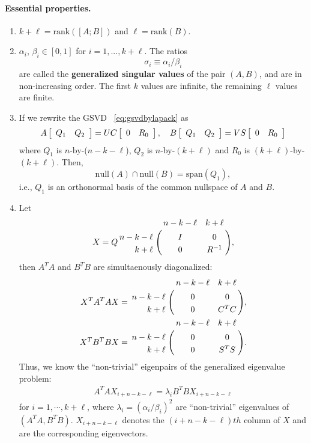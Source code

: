 \paragraph{Essential properties.} \label{properties}
\begin{enumerate}
\item $k+\ell = \mbox{rank}([A; B])$ and $\ell = \mbox{rank}(B)$.

\item 
$\alpha_i$, $\beta_i \in [0, 1]$ for $i = 1,..., k+\ell$. The ratios 
\begin{equation} \label{eq:gsvdef}  
\sigma_i \equiv \alpha_i/\beta_i
\end{equation} 
are called the 
\textbf{generalized singular values} of the pair $(A, B)$, 
and are in non-increasing order. 
The first $k$ values are infinite, 
the remaining $\ell$ values are finite.
         
\item If we rewrite the GSVD ~\eqref{eq:gsvdbylapack} as 
\begin{align}
A\left[ \begin{array}{cc} Q_1 & Q_2 \end{array} \right] = UC\left[ \begin{array}{cc} 0 & R_0 \end{array} \right], \quad 
B\left[ \begin{array}{cc} Q_1 & Q_2 \end{array} \right] = VS\left[ \begin{array}{cc} 0 & R_0 \end{array} \right]
\end{align}
where $Q_1$ is $n$-by-($n-k-\ell$), $Q_2$ is $n$-by-$(k+\ell)$ 
and $R_0$ is $(k+\ell)$-by-$(k+\ell)$. Then, 
\[
\mbox{null}(A)\cap \mbox{null}(B) = \mbox{span}(Q_1),
\] 
i.e., $Q_1$ is an orthonormal basis 
of the common nullspace of $A$ and $B$.
         
\item Let 
\begin{align} 
X = Q\bordermatrix{ & n-k-\ell & k+\ell   \cr
                   \hfill n-k-\ell & I & 0 \cr
                   \hfill k+\ell & 0 & R^{-1} }, \label{eq:simuldiag1}
\end{align}
then $A^TA$ and $B^TB$ are simultaenously diagonalized: 
\begin{subequations} \label{eq:simuldiag} 
\begin{align} 
X^TA^TAX & = \bordermatrix{ & n-k-\ell & k+\ell   \cr
                \hfill n-k-\ell & 0 & 0 \cr
                \hfill k+\ell & 0 & C^TC}, \label{eq:simuldiag2} \\ 
X^TB^TBX & = \bordermatrix{ & n-k-\ell & k+\ell   \cr
                \hfill n-k-\ell & 0 & 0 \cr
                \hfill k+\ell & 0 & S^TS}. \label{eq:simuldiag3} 
\end{align} 
\end{subequations} 
Thus, we know the ``non-trivial'' eigenpairs of the generalized eigenvalue 
problem:
\begin{align*}
A^TAX_{i+n-k-\ell} = \lambda_{i} B^TBX_{i+n-k-\ell}
\end{align*}
for $i = 1, \cdots, k+\ell$, 
where $\lambda_i = (\alpha_i/\beta_i)^2$ 
are ``non-trivial'' eigenvalues of $(A^TA, B^TB)$. 
$X_{i+n-k-\ell}$ denotes the $(i+n-k-\ell)th$ column of $X$ 
and are the corresponding eigenvectors.
            

\end{enumerate}
